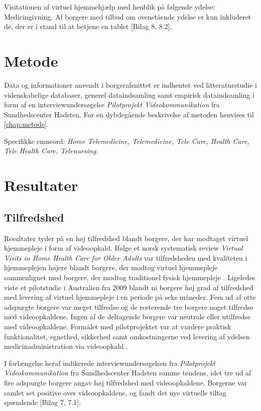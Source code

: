 Visitationen af virtuel hjemmehjælp med henblik på følgende ydelse: Medicingivning. Af borgere med tilbud om ovenstående ydelse er kun inkluderet de, der er i stand til at betjene en tablet [Bilag 8, 8.2].

\section{Metode}
Data og informationer anvendt i borgerafsnittet er indhentet ved litteraturstudie i videnskabelige databaser, generel dataindsamling samt empirisk dataindsamling i form af en interviewundersøgelse \textit{Pilotprojekt Videokommunikation} fra Sundhedscenter Hadsten. For en dybdegående beskrivelse af metoden henvises til \vref{chap:metode}.

Specifikke emneord: \textit{Home Telemedicine, Telemedicine, Tele Care, Health Care, Tele Health Care, Telenursing}.

\section{Resultater}

\subsection{Tilfredshed}
Resultater tyder på en høj tilfredshed blandt borgere, der har modtaget virtuel hjemmepleje i form af videoopkald. Ifølge et norsk systematisk review \textit{Virtual Visits in Home Health Care for Older Adults} var tilfredsheden med kvaliteten i hjemmeplejen højere blandt borgere, der modtog virtuel hjemmepleje sammenlignet med borgere, der modtog traditionel fysisk hjemmepleje \cite{Baf2}. Ligeledes viste et pilotstudie i Australien fra 2009 blandt ni borgere høj grad af tilfredshed med levering af virtuel hjemmepleje i en periode på seks måneder. Fem ud af otte adspurgte borgere var meget tilfredse og de resterende tre borgere noget tilfredse med videoopkaldene. Ingen af de deltagende borgere var neutrale eller utilfredse med videoopkaldene. Formålet med pilotprojektet var at vurdere praktisk funktionalitet, egnethed, sikkerhed samt omkostningerne ved levering af ydelsen medicinadministration via videoopkald \cite{wade}. 

I forlængelse heraf indikerede interviewundersøgelsen fra \textit{Pilotprojekt Videokommunikation} fra Sundhedscenter Hadsten samme tendens, idet tre ud af fire adspurgte borgere angav høj tilfredshed med videoopkaldene. Borgerne var samlet set positive over videoopkaldene, og fandt det nye virtuelle tiltag spændende [Bilag 7, 7.1]. 

